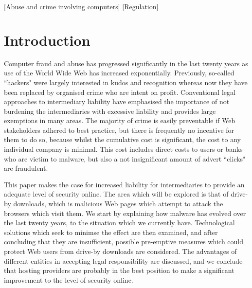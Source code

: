 \documentclass{acm_proc_article-sp}
\begin{document}
[Abuse and crime involving computers]
[Regulation]

\section{Introduction}
Computer fraud and abuse has progressed significantly in the last twenty years as use of the World Wide Web  has increased exponentially.  Previously, so-called ``hackers" were largely interested in kudos and recognition whereas now they have been replaced by organised crime who are intent on profit.  Conventional legal approaches to intermediary liability have emphasised the importance of not burdening the intermediaries with excessive liability and provides large exemptions in many areas.  The majority of crime is easily preventable if Web stakeholders adhered to best practice, but there is frequently no incentive for them to do so, because whilst the cumulative cost is significant, the cost to any individual company is minimal.  This cost includes direct costs to users or banks who are victim to malware, but also a not insignificant amount of advert ``clicks" are fraudulent.

This paper makes the case for increased liability for intermediaries to provide an adequate level of security online.  The area which will be explored is that of drive-by downloads, which is malicious Web pages which attempt to attack the browsers which visit them.  We start by explaining how malware has evolved over the last twenty years, to the situation which we currently have.  Technological solutions which seek to minimse the effect are then examined, and after concluding that they are insufficient, possible pre-emptive measures which could protect Web users from drive-by downloads are considered.  The advantages of different entities in accepting legal responsibility are discussed, and we conclude that hosting providers are probably in the best position to make a significant improvement to the level of security online.
\end{document}
